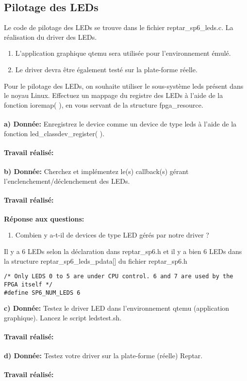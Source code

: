 \subsection{Pilotage des LEDs }
Le code de pilotage des LEDs se trouve dans le fichier reptar\_sp6\_leds.c. La réalisation du driver des
LEDs.
\begin{enumerate}
	\item L’application graphique qtemu sera utilisée pour l'environnement émulé.
	\item Le driver devra être également testé sur la plate-forme réelle.
\end{enumerate}
Pour le pilotage des LEDs, on souhaite utiliser le sous-système leds présent dans le noyau Linux.
Effectuez un mappage du registre des LEDs à l'aide de la fonction ioremap( ), en vous servant de la
structure fpga\_resource.\\\\
\textbf{a) Donnée: }Enregistrez le device comme un device de type leds à l'aide de la fonction led\_classdev\_register( ).\\\\
\textbf{Travail réalisé: }\\\\
\textbf{b) Donnée: }Cherchez et implémentez le(s) callback(s) gérant l'enclenchement/déclenchement des LEDs.\\\\
\textbf{Travail réalisé: }\\\\
\textbf{Réponse aux questions: }
\begin{enumerate}
	\item Combien y a-t-il de devices de type LED gérés par notre driver ?\\
\end{enumerate}
Il y a 6 LEDs selon la déclaration dans reptar\_sp6.h et il y a bien 6 LEDs dans la structure reptar\_sp6\_leds\_pdata[] du fichier reptar\_sp6.h
\begin{lstlisting}
/* Only LEDS 0 to 5 are under CPU control. 6 and 7 are used by the FPGA itself */
#define SP6_NUM_LEDS 6
\end{lstlisting}
\textbf{c) Donnée: }Testez le driver LED dans l'environnement qtemu (application graphique). Lancez le script
ledstest.sh.\\\\
\textbf{Travail réalisé: }\\\\
\textbf{d) Donnée: }Testez votre driver sur la plate-forme (réelle) Reptar.\\\\
\textbf{Travail réalisé: }\\\\
